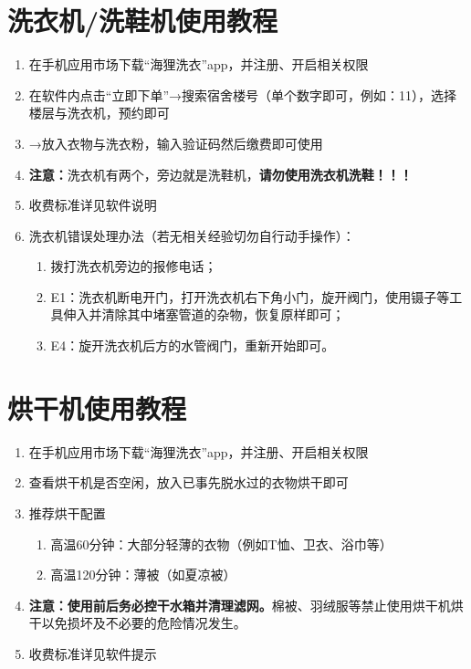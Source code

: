 \section[洗衣机/洗鞋机使用教程]{洗衣机/洗鞋机使用教程}
\label{washing_machine}
\begin{enumerate}
    \item 在手机应用市场下载“海狸洗衣”app，并注册、开启相关权限
    \item 在软件内点击“立即下单”→搜索宿舍楼号（单个数字即可，例如：11），选择楼层与洗衣机，预约即可
    \item →放入衣物与洗衣粉，输入验证码然后缴费即可使用
    \item \textbf{注意：}洗衣机有两个，旁边就是洗鞋机，\textbf{请勿使用洗衣机洗鞋！！！}
    \item 收费标准详见软件说明
    \item 洗衣机错误处理办法（若无相关经验切勿自行动手操作）：
          \begin{enumerate}
              \item 拨打洗衣机旁边的报修电话；
              \item E1：洗衣机断电开门，打开洗衣机右下角小门，旋开阀门，使用镊子等工具伸入并清除其中堵塞管道的杂物，恢复原样即可；
              \item E4：旋开洗衣机后方的水管阀门，重新开始即可。
          \end{enumerate}
\end{enumerate}

\section[烘干机使用教程]{烘干机使用教程}
\label{dry_machine}
\begin{enumerate}
    \item 在手机应用市场下载“海狸洗衣”app，并注册、开启相关权限
    \item 查看烘干机是否空闲，放入已事先脱水过的衣物烘干即可
    \item 推荐烘干配置
          \begin{enumerate}
              \item 高温60分钟：大部分轻薄的衣物（例如T恤、卫衣、浴巾等）
              \item 高温120分钟：薄被（如夏凉被）
          \end{enumerate}
    \item \textbf{注意：}\textbf{使用前后务必控干水箱并清理滤网。}棉被、羽绒服等禁止使用烘干机烘干以免损坏及不必要的危险情况发生。
    \item 收费标准详见软件提示
\end{enumerate}

